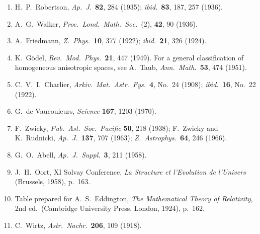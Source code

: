 \begin{enumerate}
  \item{}\label{ch14-ref-1}
  H.~P.~Robertson, \emph{Ap.\ J.}\ \textbf{82}, 284 (1935);
  \emph{ibid.}\ \textbf{83}, 187, 257 (1936).

  \item{}\label{ch14-ref-2}
  A.~G.~Walker, \emph{Proc.\ Lond.\ Math.\ Soc.}\ (2), \textbf{42}, 90
  (1936).

  \item{}\label{ch14-ref-3}
  A.~Friedmann, \emph{Z.\ Phys.}\ \textbf{10}, 377 (1922);
  \emph{ibid.}\ \textbf{21}, 326 (1924).

  \item{}\label{ch14-ref-4}
  K.~G\"odel, \emph{Rev.\ Mod.\ Phys.}\ \textbf{21}, 447 (1949).
  For a general classification of homogeneous anisotropic spaces, see
  A.~Taub, \emph{Ann.\ Math.}\ \textbf{53}, 474 (1951).

  \item{}\label{ch14-ref-5}
  C.~V.~I.~Charlier, \emph{Arkiv.\ Mat.\ Astr.\ Fys.}\ \textbf{4},
  No.~24 (1908); \emph{ibid.}\ \textbf{16}, No.~22 (1922).

  \item{}\label{ch14-ref-6}
  G.~de Vaucouleurs, \emph{Science} \textbf{167}, 1203 (1970).

  \item{}\label{ch14-ref-7}
  F.~Zwicky, \emph{Pub.\ Ast.\ Soc.\ Pacific} \textbf{50}, 218 (1938);
  F.~Zwicky and K.~Rudnicki, \emph{Ap.\ J.}\ \textbf{137}, 707 (1963);
  \emph{Z.\ Astrophys.}\ \textbf{64}, 246 (1966).

  \item{}\label{ch14-ref-8}
  G.~O.~Abell, \emph{Ap.\ J.\ Suppl.}\ \textbf{3}, 211 (1958).

  \item{}\label{ch14-ref-9}
  J.~H.~Oort, XI Solvay Conference,
  \emph{La Structure et l'Evolution de l'Univers}
  (Brussels, 1958), p.~163.

  \item{}\label{ch14-ref-10}
  Table prepared for A.~S.~Eddington,
  \emph{The Mathematical Theory of Relativity}, 2nd ed.\
  (Cambridge University Press, London, 1924), p.~162.

  \item{}\label{ch14-ref-11}
  C.~Wirtz, \emph{Astr.\ Nachr.}\ \textbf{206}, 109 (1918).


\end{enumerate}
